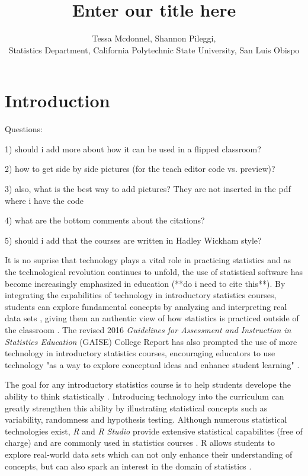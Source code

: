 \documentclass[12pt]{article}
\title{Enter our title here}
\author{Tessa Mcdonnel, Shannon Pileggi,  \\Statistics Department, California Polytechnic State University, San Luis Obispo}
\begin{document}
\maketitle

\section{Introduction}

Questions: 

1) should i add more about how it can be used in a flipped classroom?

2) how to get side by side pictures (for the teach editor code vs. preview)?

3) also, what is the best way to add pictures? They are not inserted in the pdf where i have the code

4) what are the bottom comments about the citations?

5) should i add that the courses are written in Hadley Wickham style?

It is no suprise that technology plays a vital role in practicing statistics and as the technological revolution continues to
unfold, the use of statistical software has become increasingly emphasized in education (**do i need to cite this**). By integrating the
capabilities of technology in introductory statistics courses, students can explore fundamental concepts by analyzing and
interpreting real data sets \cite{Chance2007, Hardin2015, Horton2014}, giving them an authentic view of how statistics is practiced outside of the
classroom \citet{wang2017}. The revised 2016 \textit{Guidelines for Assessment and Instruction in Statistics Education}
(GAISE) College Report has also prompted the use of more technology in introductory statistics courses, encouraging educators
to use technology "as a way to explore conceptual ideas and enhance student learning" \cite{AmericanStatisticalAssociation2016}.

The goal for any introductory statistics course is to help students develope the ability to think statistically
\cite{AmericanStatisticalAssociation2016}.
Introducing technology into the curriculum can greatly strengthen this ability by illustrating statistical concepts such as
variability, randomness and hypothesis testing. Although numerous statistical technologies exist, \textit{R} and \textit{R Studio}
provide extensive statistical capabilites (free of charge) and are commonly used in statistics courses \cite{Chance2007}. R
allows students to explore real-world data sets which can not only enhance their understanding of concepts, but can also spark
an interest in the domain of statistics \cite{Wang2017}.
\end{document}
